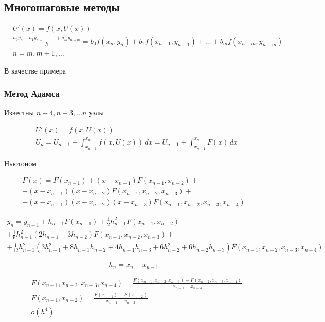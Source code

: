 \subsection{Многошаговые методы}

\begin{align*}
	&U'(x) = f(x, U(x))
	\\
	&\frac{a_0 y_n + a_1 y_{n-1} + \dots + a_m y_{n-m}}{h} = b_0 f(x_n, y_n) + b_1 f(x_{n-1}, y_{n-1}) + \dots + b_m f(x_{n-m}, y_{n-m})
	\\
	&n = m, m+1, \dots
\end{align*}

В качестве примера
\subsubsection{Метод Адамса}

Известны $n-4, n-3, \dots n$ узлы

\begin{align*}
	&U'(x) =  f(x, U(x))
	\\
	&U_{n} = U_{n-1} + \int_{x_{n-1}}^{x_{n}} f(x, U(x))\, dx = U_{n-1} + \int_{x_{n-1}}^{x_n} F(x)\, dx
\end{align*}

Ньютоном

\begin{multline*}
	F(x) = F(x_{n-1}) + (x-x_{n-1})F(x_{n-1}, x_{n-2}) + \\
		+ (x - x_{n-1})(x - x_{n-2})F(x_{n-1}, x_{n-2}, x_{n-3}) + \\
		+ (x - x_{n-1})(x - x_{n-2})(x - x_{n-3})F(x_{n-1}, x_{n-2}, x_{n-3}, x_{n-4}) 
\end{multline*}

\begin{multline*}
	y_n = y_{n-1} + h_{n-1} F(x_{n-1}) + \frac{1}{2} h^2_{n-1} F(x_{n-1}, x_{n-2}) + \\
	+ \frac{1}{6} h^2_{n-1} (2h_{n-1} + 3h_{n-2})F(x_{n-1}, x_{n-2}, x_{n-3}) + \\
	+ \frac{1}{12} h^2_{n-1} (3h^2_{n-1} + 8 h_{n-1}h_{n-2} + 4h_{n-1}h_{n-3} + 6 h^2_{n-2} + 6h_{n-2}h_{n-3}) F(x_{n-1}, x_{n-2}, x_{n-3}, x_{n-4}) 
\end{multline*}

\[
	h_n = x_n - x_{n-1}
\]

\begin{align*}
	&F(x_{n-1}, x_{n-2}, x_{n-3}, x_{n-4}) = \frac{F(x_{n-1}, x_{n-2}, x_{n-3}) - F(x_{n-2}, x_{n-3}, x_{n-4})}{x_{n-1} - x_{n-4}}
	\\
	&F(x_{n-1}, x_{n-2}) = \frac{F(x_{n-1}) - F(x_{n-2})}{x_{n-1} - x_{n-2}}
	\\
	&o(h^4)
\end{align*}


